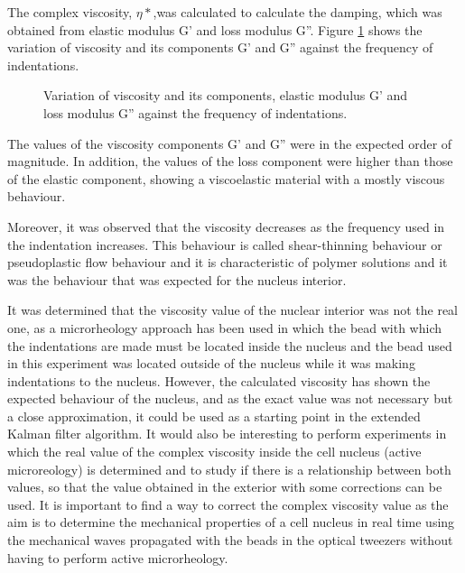 \documentclass[12pt, a4paper]{article} %
\begin{document}
\newpage

The complex viscosity, $\eta *$,was calculated to calculate the damping, which was obtained from elastic modulus G' and loss modulus G''. Figure \ref{fig:vicosidad} shows the variation of viscosity and its components G' and G'' against the frequency of indentations.

\begin{figure}[H]
	\centering
	
	\caption{Variation of viscosity and its components, elastic modulus G' and loss modulus G'' against the frequency of indentations.}
	\label{fig:vicosidad}
\end{figure}

The values of the viscosity components G' and G'' were in the expected order of magnitude. In addition, the values of the loss component were higher than those of the elastic component, showing a viscoelastic material with a mostly viscous behaviour. 

Moreover, it was observed that the viscosity decreases as the frequency used in the indentation increases. This behaviour is called shear-thinning behaviour or pseudoplastic flow behaviour and it is characteristic of polymer solutions \cite{mezger2020rheology} and it was the behaviour that was expected for the nucleus interior. 

\newpage

It was determined that the viscosity value of the nuclear interior was not the real one, as a microrheology approach has been used in which the bead with which the indentations are made must be located inside the nucleus and the bead used in this experiment was located outside of the nucleus while it was making indentations to the nucleus. However, the calculated viscosity has shown the expected behaviour of the nucleus, and as the exact value was not necessary but a close approximation, it could be used as a starting point in the extended Kalman filter algorithm. It would also be interesting to perform experiments in which the real value of the complex viscosity inside the cell nucleus (active microreology) is determined and to study if there is a relationship between both values, so that the value obtained in the exterior with some corrections can be used. It is important to find a way to correct the complex viscosity value as the aim is to determine the mechanical properties of a cell nucleus in real time using the mechanical waves propagated with the beads in the optical tweezers without having to perform active microrheology.
\end{document}
